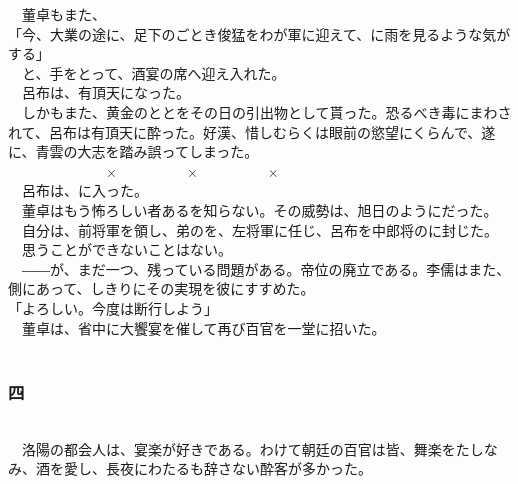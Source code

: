 \documentclass[
  paper=a5,
  fontsize=10pt,
  jafontsize=9.5pt,
  tate,                  %
  open_bracket_pos=nibu, %
]{jlreq}
\begin{document}
　董卓もまた、\\


「今、大業の途に、足下のごとき俊猛をわが軍に迎えて、に雨を見るような気がする」\\


　と、手をとって、酒宴の席へ迎え入れた。\\


　呂布は、有頂天になった。\\


　しかもまた、黄金のととをその日の引出物として貰った。恐るべき毒にまわされて、呂布は有頂天に酔った。好漢、惜しむらくは眼前の慾望にくらんで、遂に、青雲の大志を踏み誤ってしまった。\\


　　　　　　　×　　　　　×　　　　　×\\


　呂布は、に入った。\\


　董卓はもう怖ろしい者あるを知らない。その威勢は、旭日のようにだった。\\


　自分は、前将軍を領し、弟のを、左将軍に任じ、呂布を中郎将のに封じた。\\


　思うことができないことはない。\\


　――が、まだ一つ、残っている問題がある。帝位の廃立である。李儒はまた、側にあって、しきりにその実現を彼にすすめた。\\


「よろしい。今度は断行しよう」\\


　董卓は、省中に大饗宴を催して再び百官を一堂に招いた。\\

\\

\subsubsection{四}

\\


　洛陽の都会人は、宴楽が好きである。わけて朝廷の百官は皆、舞楽をたしなみ、酒を愛し、長夜にわたるも辞さない酔客が多かった。\\
\end{document}
